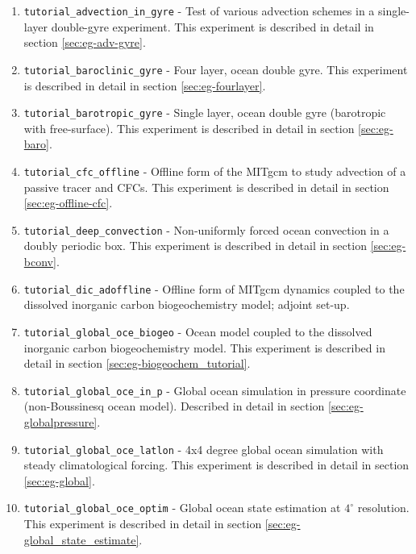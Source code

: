 \begin{enumerate}

\item \texttt{tutorial\_advection\_in\_gyre} - Test of various
  advection schemes in a single-layer double-gyre experiment.
  This experiment is described in detail in section
  \ref{sec:eg-adv-gyre}.

\item \texttt{tutorial\_baroclinic\_gyre} - Four layer, ocean double
  gyre. This experiment is described in detail in section
  \ref{sec:eg-fourlayer}.

\item \texttt{tutorial\_barotropic\_gyre} - Single layer, ocean double
  gyre (barotropic with free-surface).
  This experiment is described in detail in section \ref{sec:eg-baro}.

\item \texttt{tutorial\_cfc\_offline} - Offline form of the MITgcm to
  study advection of a passive tracer and CFCs.
  This experiment is described in detail in section \ref{sec:eg-offline-cfc}.

\item \texttt{tutorial\_deep\_convection} - Non-uniformly forced
  ocean convection in a doubly periodic box. This experiment is
  described in detail in section \ref{sec:eg-bconv}.

\item \texttt{tutorial\_dic\_adoffline} - Offline form of MITgcm
  dynamics coupled to the dissolved inorganic carbon biogeochemistry model;
  adjoint set-up.

\item \texttt{tutorial\_global\_oce\_biogeo} - Ocean model coupled to
  the dissolved inorganic carbon biogeochemistry model. This
  experiment is described in detail in section
  \ref{sec:eg-biogeochem_tutorial}.

\item \texttt{tutorial\_global\_oce\_in\_p} - Global ocean simulation in
  pressure coordinate (non-Boussinesq ocean model). Described in
  detail in section \ref{sec:eg-globalpressure}.

\item \texttt{tutorial\_global\_oce\_latlon} - 4x4 degree global ocean
  simulation with steady climatological forcing. This experiment is
  described in detail in section \ref{sec:eg-global}.

\item \texttt{tutorial\_global\_oce\_optim} - Global ocean state
  estimation at $4^\circ$ resolution.  This experiment is described in
  detail in section \ref{sec:eg-global_state_estimate}.


\end{enumerate}
